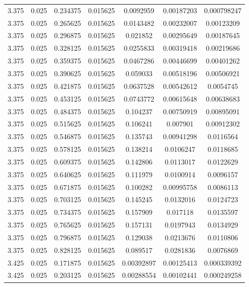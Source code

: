 \begin{table}[bh]
\begin{center}
{\begin{tabular}{ccccccc}
3.375	 & 0.025 & 	0.234375	 & 0.015625	 & 0.0092959	 & 0.00187203	 & 0.000798247 \\ 
3.375	 & 0.025 & 	0.265625	 & 0.015625	 & 0.0143482	 & 0.00232007	 & 0.00123209 \\ 
3.375	 & 0.025 & 	0.296875	 & 0.015625	 & 0.021852	 & 0.00295649	 & 0.00187645 \\ 
3.375	 & 0.025 & 	0.328125	 & 0.015625	 & 0.0255833	 & 0.00319418	 & 0.00219686 \\ 
3.375	 & 0.025 & 	0.359375	 & 0.015625	 & 0.0467286	 & 0.00446699	 & 0.00401262 \\ 
3.375	 & 0.025 & 	0.390625	 & 0.015625	 & 0.059033	 & 0.00518196	 & 0.00506921 \\ 
3.375	 & 0.025 & 	0.421875	 & 0.015625	 & 0.0637528	 & 0.00542612	 & 0.0054745 \\ 
3.375	 & 0.025 & 	0.453125	 & 0.015625	 & 0.0743772	 & 0.00615648	 & 0.00638683 \\ 
3.375	 & 0.025 & 	0.484375	 & 0.015625	 & 0.104237	 & 0.00750919	 & 0.00895091 \\ 
3.375	 & 0.025 & 	0.515625	 & 0.015625	 & 0.106241	 & 0.007901	 & 0.00912302 \\ 
3.375	 & 0.025 & 	0.546875	 & 0.015625	 & 0.135743	 & 0.00941298	 & 0.0116564 \\ 
3.375	 & 0.025 & 	0.578125	 & 0.015625	 & 0.138214	 & 0.0106247	 & 0.0118685 \\ 
3.375	 & 0.025 & 	0.609375	 & 0.015625	 & 0.142806	 & 0.0113017	 & 0.0122629 \\ 
3.375	 & 0.025 & 	0.640625	 & 0.015625	 & 0.111979	 & 0.0100914	 & 0.0096157 \\ 
3.375	 & 0.025 & 	0.671875	 & 0.015625	 & 0.100282	 & 0.00995758	 & 0.0086113 \\ 
3.375	 & 0.025 & 	0.703125	 & 0.015625	 & 0.145245	 & 0.0132016	 & 0.0124723 \\ 
3.375	 & 0.025 & 	0.734375	 & 0.015625	 & 0.157909	 & 0.017118	 & 0.0135597 \\ 
3.375	 & 0.025 & 	0.765625	 & 0.015625	 & 0.157131	 & 0.0197943	 & 0.0134929 \\ 
3.375	 & 0.025 & 	0.796875	 & 0.015625	 & 0.129038	 & 0.0213676	 & 0.0110806 \\ 
3.375	 & 0.025 & 	0.828125	 & 0.015625	 & 0.089517	 & 0.0281836	 & 0.0076869 \\ 
3.425	 & 0.025 & 	0.171875	 & 0.015625	 & 0.00392897	 & 0.00125413	 & 0.000339392 \\ 
3.425	 & 0.025 & 	0.203125	 & 0.015625	 & 0.00288554	 & 0.00102441	 & 0.000249258 \\ 

\end{tabular}}
\end{center}
\end{table}
